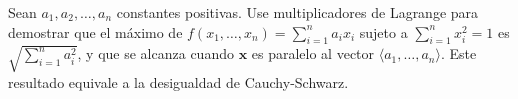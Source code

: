 Sean $a_1, a_2, \dots, a_n$ constantes positivas. Use multiplicadores de Lagrange para demostrar que el máximo de $f(x_1, \dots, x_n) = \sum_{i=1}^{n} a_i x_i$ sujeto a $\sum_{i=1}^{n} x_i^2 = 1$ es $\sqrt{\sum_{i=1}^{n} a_i^2}$, y que se alcanza cuando $\mathbf{x}$ es paralelo al vector $\langle a_1, \dots, a_n \rangle$. Este resultado equivale a la desigualdad de Cauchy-Schwarz.
